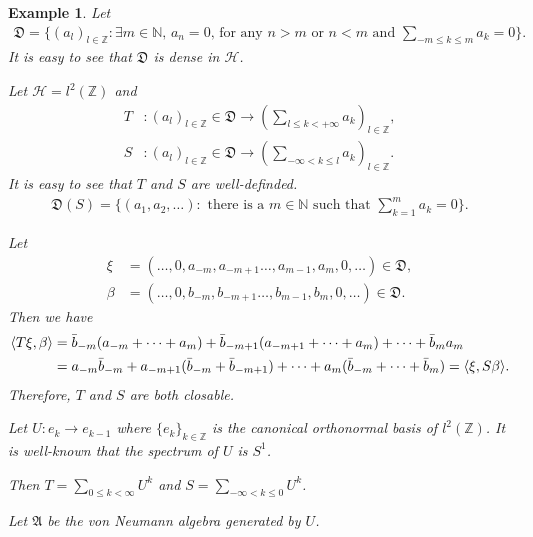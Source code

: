 \documentclass[a4paper,10pt]{amsart}
\newtheorem{example}{Example}[section]
\newcommand{\AAA}{\mathfrak A}
\newcommand{\HHH}{\mathcal H} %
\newcommand{\DDD}{\mathfrak D}
\newcommand{\Z}{\mathbb Z} %
\newcommand{\N}{\mathbb N} %
\begin{document}
\begin{example}
Let
\begin{align*}
    \DDD = \{(a_l)_{l \in \Z} : \mbox{$\exists m \in \N$, $a_n = 0$,
            for any $n > m$ or $n < m$ and 
$\sum_{-m \leq k \leq m}a_{k} = 0$}\}. 
\end{align*}
It is easy to see that $\DDD$ is dense in $\HHH$.

Let $\HHH = l^{2}(\Z)$ and 
\begin{align*}
    T &: (a_l)_{l \in \Z} \in \DDD \to 
    (\sum_{l \leq k <+\infty} a_k)_{l \in \Z},\\
    S &: (a_l)_{l \in \Z} \in \DDD \to 
    (\sum_{-\infty < k \leq l}a_k)_{l \in \Z}.
\end{align*}
It is easy to see that $T$ and $S$ are well-definded. 
\begin{align*}
    \DDD(S) = \{(a_1, a_2, \ldots) : \mbox{ there is a $m \in \N$ such
    that $\sum^{m}_{k=1}a_k = 0$} \}.
\end{align*}

Let 
\begin{align*}
\xi &= (\ldots, 0, a_{-m}, a_{-m+1} \ldots, a_{m-1}, a_{m}, 0, \ldots) 
\in \DDD, \\  
\beta &= (\ldots, 0, b_{-m}, b_{-m+1} \ldots, b_{m-1}, b_{m}, 0, \ldots)
\in \DDD.
\end{align*}
Then we have
\begin{align*}
    \langle T\xi, \beta \rangle &= \Bar{b}_{-m}(a_{-m} + \cdots + a_{m})
    + \Bar{b}_{-m+1}(a_{-m+1} + \cdots + a_{m}) + \cdots + 
    \Bar{b}_{m}a_m \\
    & = a_{-m}\Bar{b}_{-m} + a_{-m+1}(\Bar{b}_{-m} + \Bar{b}_{-m+1}) 
    + \cdots + 
    a_{m}(\Bar{b}_{-m} + \cdots + \Bar{b}_{m}) = 
    \langle \xi, S\beta \rangle.
\end{align*}
Therefore, $T$ and $S$ are both closable.

Let $U: e_{k} \to e_{k-1}$ where $\{e_{k}\}_{k \in \Z }$ is the canonical 
orthonormal basis of $l^{2}(\Z)$. It is well-known that the 
spectrum of $U$ is $S^{1}$.

Then $T = \sum_{0 \leq k <\infty} U^{k}$ and 
$S = \sum_{-\infty < k \leq 0} U^{k}$.

Let $\AAA$ be the von Neumann algebra generated by $U$.


\end{example}
\end{document}
